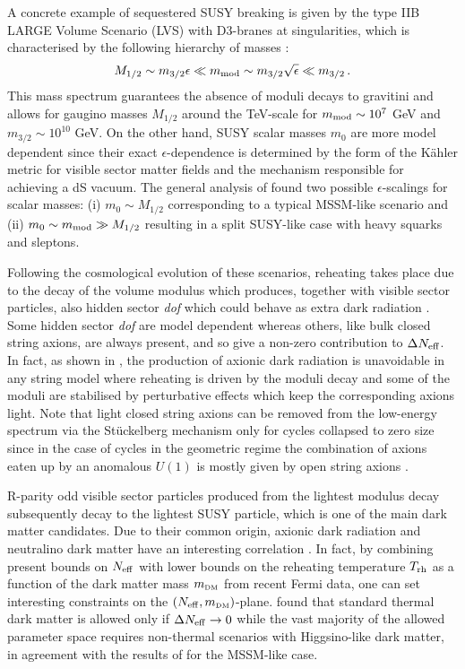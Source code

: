 \documentclass[11pt,a4paper]{article}
\newcommand{\be}{\begin{equation}}
\newcommand{\ee}{\end{equation}}
\def\DM{{\scriptscriptstyle \rm DM}}
\begin{document}
A concrete example of sequestered SUSY breaking is given by the type IIB LARGE Volume Scenario (LVS) with D3-branes at singularities, which is characterised by the following hierarchy of masses \cite{SeqLVS}:
\be
M_{1/2}\sim m_{3/2} \epsilon \ll m_{\rm mod} \sim m_{3/2} \sqrt{\epsilon} \ll m_{3/2}\,.
\label{masses}
\ee
This mass spectrum guarantees the absence of moduli decays to gravitini and allows for gaugino masses $M_{1/2}$ around the TeV-scale for $m_{\rm mod}\sim 10^7$ GeV and $m_{3/2}\sim 10^{10}$ GeV. On the other hand, SUSY scalar masses $m_0$ are more model dependent since their exact $\epsilon$-dependence is determined by the form of the K\"ahler metric for visible sector matter fields and the mechanism responsible for achieving a dS vacuum. The general analysis of \cite{SoftTermsSeqLVS} found two possible $\epsilon$-scalings for scalar masses: (i) $m_0\sim M_{1/2}$ corresponding to a typical MSSM-like scenario and (ii) $m_0 \sim m_{\rm mod} \gg M_{1/2}$ resulting in a split SUSY-like case with heavy squarks and sleptons.

Following the cosmological evolution of these scenarios, reheating takes place due to the decay of the volume modulus which produces, together with visible sector particles, also hidden sector \textit{dof} which could behave as extra dark radiation \cite{DR1, DR2}. Some hidden sector \textit{dof} are model dependent whereas others, like bulk closed string axions, are always present, and so give a non-zero contribution to $\Delta N_{\rm eff}$. In fact, as shown in \cite{DMDRcorr}, the production of axionic dark radiation is unavoidable in any string model where reheating is driven by the moduli decay and some of the moduli are stabilised by perturbative effects which keep the corresponding axions light. Note that light closed string axions can be removed from the low-energy spectrum via the St\"uckelberg mechanism only for cycles collapsed to zero size since in the case of cycles in the geometric regime the combination of axions eaten up by an anomalous $U(1)$ is mostly given by open string axions \cite{DMDRcorr}. 

R-parity odd visible sector particles produced from the lightest modulus decay subsequently decay to the lightest SUSY particle, which is one of the main dark matter candidates. Due to their common origin, axionic dark radiation and neutralino dark matter have an interesting correlation \cite{DMDRcorr}. In fact, by combining present bounds on $N_{\rm eff}$ with lower bounds on the reheating temperature $T_{\rm rh}$ as a function of the dark matter mass $m_\DM$ from recent Fermi data, one can set interesting constraints on the $(N_{\rm eff}, m_\DM)$-plane. \cite{DMDRcorr} found that standard thermal dark matter is allowed only if $\Delta N_{\rm eff}\to 0$ while the vast majority of the allowed parameter space requires non-thermal scenarios with Higgsino-like dark matter, in agreement with the results of \cite{Aparicio:2015sda} for the MSSM-like case.
\end{document}
